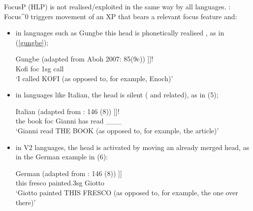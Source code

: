 \documentclass[fleqn,10pt]{wlscirep}
\begin{document}
\noindent FocusP (HLP) is not realised/exploited in the same way by all languages. \citet{samo2019cartography}: Focus^0 triggers movement of an XP that bears a relevant focus feature and:
\begin{itemize}
    \item \vspace*{-2mm} in languages such as Gungbe this head is phonetically realised \citep{aboh2004morphosyntax}, as in (\ref{gungbe});
    
        \begin{exe}
            \ex Gungbe (adapted from Aboh 2007: 85(9c))
                \gll [\textsubscript{FocusP}  	KÒFÍ\textsubscript{i}   [\textsubscript{Focus^0} 	wè 			[	ùn   		yró		\_\_\_\textsubscript{i}		]]]!\\
                {} Kofi        {} 			foc    {}    	1sg   	call {} {}\\
                \vspace{-3mm}
                \glt ‘I called KOFI (as opposed to, for example, Enoch)’
        \label{gungbe}
        \end{exe}

    \item \vspace*{-2mm} in languages like Italian, the head is silent (\citealt{rizzi1997fine} and related), as in (5);
        \begin{exe}
            \ex Italian (adapted from \citealt{samo2019cartography}: 146 (8))
                \gll [\textsubscript{FocusP} 	IL LIBRO\textsubscript{i}	    [\textsubscript{Focus^0} 	$\emptyset$ 		[	Gianni 		ha 		letto 	\_\_\_\textsubscript{i}	]]]!\\
                {} the book				{}		foc		{}	Gianni 		has 	read 	\_\_\_\\
                \vspace{-3mm}
                \glt ‘Gianni read THE BOOK (as opposed to, for example, the article)’	
        \end{exe}

    \item \vspace*{-2mm} in V2 languages, the head is activated by moving an already merged head, as in the German example in (6):
        \begin{exe}
            \ex	German (adapted from \citealt{samo2019cartography}: 146 (8))
                \gll [\textsubscript{SpecFoc} 	DIESES 	FRESKO 	[\textsubscript{Focus^0} 	malte				[	Giotto ]]]\\
                {} this 			fresco			{}		painted.3sg	{}	Giotto \\
                \vspace*{-3mm}
                \glt ‘Giotto painted THIS FRESCO (as opposed to, for example, the one over there)’
        \end{exe}

\end{itemize}
\end{document}
